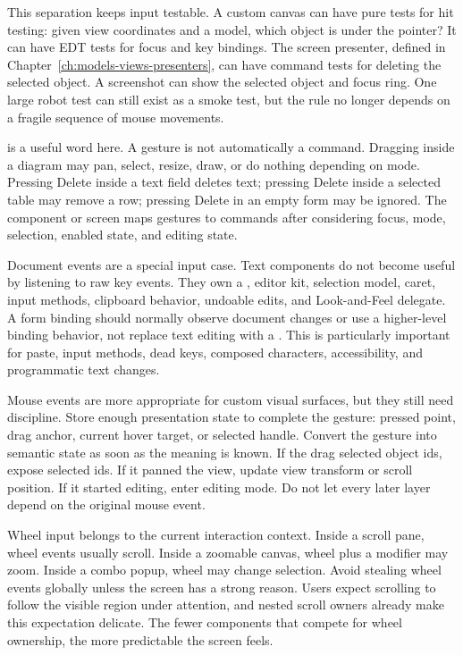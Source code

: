 This separation keeps input testable. A custom canvas can have pure tests for hit testing: given view coordinates and a model, which object is under the pointer? It can have EDT tests for focus and key bindings. The screen presenter, defined in Chapter~\ref{ch:models-views-presenters}, can have command tests for deleting the selected object. A screenshot can show the selected object and focus ring. One large robot test can still exist as a smoke test, but the rule no longer depends on a fragile sequence of mouse movements.

 is a useful word here. A gesture is not automatically a command. Dragging inside a diagram may pan, select, resize, draw, or do nothing depending on mode. Pressing Delete inside a text field deletes text; pressing Delete inside a selected table may remove a row; pressing Delete in an empty form may be ignored. The component or screen maps gestures to commands after considering focus, mode, selection, enabled state, and editing state.

Document events are a special input case. Text components do not become useful by listening to raw key events. They own a , editor kit, selection model, caret, input methods, clipboard behavior, undoable edits, and Look-and-Feel delegate. A form binding should normally observe document changes or use a higher-level binding behavior, not replace text editing with a . This is particularly important for paste, input methods, dead keys, composed characters, accessibility, and programmatic text changes.

Mouse events are more appropriate for custom visual surfaces, but they still need discipline. Store enough presentation state to complete the gesture: pressed point, drag anchor, current hover target, or selected handle. Convert the gesture into semantic state as soon as the meaning is known. If the drag selected object ids, expose selected ids. If it panned the view, update view transform or scroll position. If it started editing, enter editing mode. Do not let every later layer depend on the original mouse event.

Wheel input belongs to the current interaction context. Inside a scroll pane, wheel events usually scroll. Inside a zoomable canvas, wheel plus a modifier may zoom. Inside a combo popup, wheel may change selection. Avoid stealing wheel events globally unless the screen has a strong reason. Users expect scrolling to follow the visible region under attention, and nested scroll owners already make this expectation delicate. The fewer components that compete for wheel ownership, the more predictable the screen feels.

